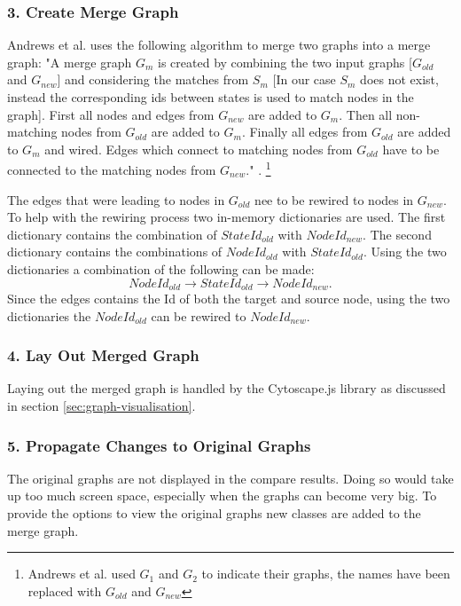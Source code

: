 \subsubsection{3. Create Merge Graph}
Andrews et al. uses the following algorithm to merge two graphs into a merge graph: "A merge graph $G_m$ is created by combining the two input graphs [$G_{old}$ and $G_{new}$] and considering the matches from $S_m$ [In our case $S_m$ does not exist, instead the corresponding ids between states is used to match nodes in the graph]. First all nodes and edges from $G_{new}$ are added to $G_m$. Then all non-matching nodes from $G_{old}$ are added to $G_m$. Finally all edges from $G_{old}$ are added to $G_m$ and wired. Edges which connect to matching nodes from $G_{old}$ have to be connected to the matching nodes from $G_{new}$." \cite{andrews2009visual}. \footnote{Andrews et al. used $G_1$ and $G_2$ to indicate their graphs, the names have been replaced with $G_{old}$ and $G_{new}$}

The edges that were leading to nodes in $G_{old}$ nee to be rewired to nodes in $G_{new}$. To help with the rewiring process two in-memory dictionaries are used. The first dictionary contains the combination of $StateId_{old}$ with $NodeId_{new}$. The second dictionary contains the combinations of $NodeId_{old}$ with $StateId_{old}$. Using the two dictionaries a combination of the following can be made:
\[ NodeId_{old} \rightarrow  StateId_{old} \rightarrow NodeId_{new}. \]
Since the edges contains the Id of both the target and source node, using the two dictionaries the $NodeId_{old}$ can be rewired to $NodeId_{new}$.

\subsubsection{4. Lay Out Merged Graph}

Laying out the merged graph is handled by the Cytoscape.js library as discussed in section \ref{sec:graph-visualisation}.

\subsubsection{5. Propagate Changes to Original Graphs}

The original graphs are not displayed in the compare results. Doing so would take up too much screen space, especially when the graphs can become very big. To provide the options to view the original graphs new classes are added to the merge graph. 

